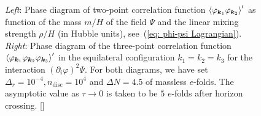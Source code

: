 \documentclass[11pt]{article}
\numberwithin{equation}{section} %
\begin{document}
\begin{figure}[h!]
  \centering
  \hspace*{0.2cm}
  \vspace*{0.2cm}
  \caption{\textit{Left}: Phase diagram of two-point correlation function $\braket{\varphi_{\bm{k}_1} \varphi_{\bm{k}_2}}'$ as function of the mass $m/H$ of the field $\Psi$ and the linear mixing strength $\rho/H$ (in Hubble units), see~(\ref{eq: phi-psi Lagrangian}). \textit{Right}: Phase diagram of the three-point correlation function $\braket{\varphi_{\bm{k}_1} \varphi_{\bm{k}_2} \varphi_{\bm{k}_3}}'$ in the equilateral configuration $k_1=k_2=k_3$ for the interaction $(\partial_i \varphi)^2 \Psi$. For both diagrams, we have set $\Delta_r = 10^{-4}, n_{\text{disc}} = 10^4$ and $\Delta N = 4.5$ of massless $e$-folds. The asymptotic value as $\tau\rightarrow 0$ is taken to be $5$ $e$-folds after horizon crossing. [\href{https://github.com/deniswerth/CosmoFlow/blob/main/CosmoFlow/PhiPsi/PhaseDiagram.ipynb}{\faGithub}]}
  \label{fig: Phase Diagram}
\end{figure}
\end{document}
